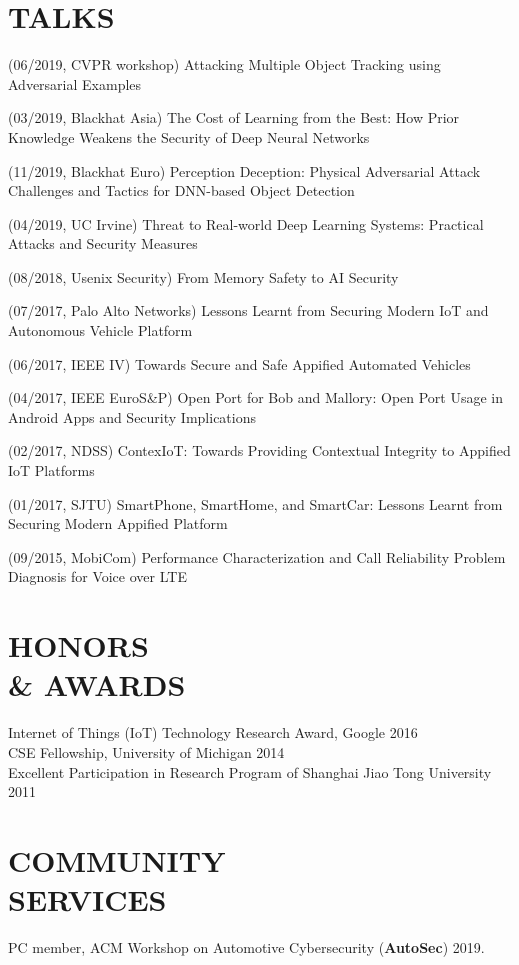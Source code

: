 \documentclass[margin]{res}
\begin{document}
\begin{resume}
\section{TALKS}

(06/2019, CVPR workshop) Attacking Multiple Object Tracking using Adversarial Examples

(03/2019, Blackhat Asia) The Cost of Learning from the Best: How Prior Knowledge Weakens the Security of Deep Neural Networks

(11/2019, Blackhat Euro) Perception Deception: Physical Adversarial Attack Challenges and Tactics for DNN-based Object Detection

(04/2019, UC Irvine) Threat to Real-world Deep Learning Systems: Practical Attacks and Security Measures

(08/2018, Usenix Security) From Memory Safety to AI Security

(07/2017, Palo Alto Networks) Lessons Learnt from Securing Modern IoT and Autonomous Vehicle Platform

(06/2017, IEEE IV) Towards Secure and Safe Appified Automated Vehicles

(04/2017, IEEE EuroS\&P) Open Port for Bob and Mallory: Open Port Usage in Android Apps and Security Implications

(02/2017, NDSS) ContexIoT: Towards Providing Contextual Integrity to Appified IoT Platforms

(01/2017, SJTU) SmartPhone, SmartHome, and SmartCar: Lessons Learnt from Securing Modern Appified Platform

(09/2015, MobiCom) Performance Characterization and Call Reliability Problem Diagnosis for Voice over LTE

\section{HONORS\\ \& AWARDS}
Internet of Things (IoT) Technology Research Award, Google \hfill 2016\\
CSE Fellowship, University of Michigan \hfill 2014 \\
Excellent Participation in Research Program of Shanghai Jiao Tong University \hfill 2011 \\

\section{COMMUNITY\\ SERVICES}
PC member, ACM Workshop on Automotive Cybersecurity (\textbf{AutoSec}) 2019.
\end{resume}
\end{document}
